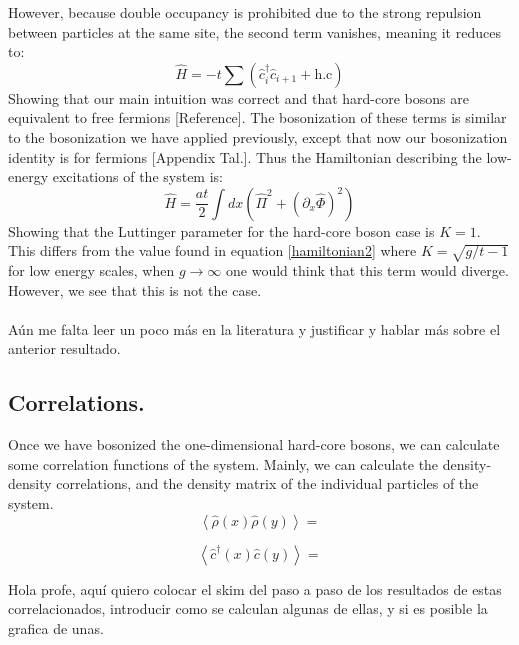 However, because double occupancy is prohibited due to the strong repulsion between particles at the same site, the second term vanishes, meaning it reduces to:
\begin{equation}
    \hat{H} = -t \sum \left( \hat{c}_{i}^{\dagger}\hat{c}_{i+1}^{} + \text{h.c}
 \right) 
\end{equation}
Showing that our main intuition was correct and that hard-core bosons are equivalent to free fermions [Reference]. The bosonization of these terms is similar to the bosonization we have applied previously, except that now our bosonization identity is for fermions [Appendix Tal.]. Thus the Hamiltonian describing the low-energy excitations of the system is:
\begin{equation}
    \hat{H} = \frac{at}{2} \int dx \left( \hat{\Pi}^{2} + \left(\partial_{x} \hat{\Phi}\right)^{2} \right)
\end{equation}
Showing that the Luttinger parameter for the hard-core boson case is $K=1$. This differs from the value found in equation \ref{hamiltonian2} where $K= \sqrt{g/t -1}$ for low energy scales, when $g \rightarrow \infty$ one would think that this term would diverge. However, we see that this is not the case.\\ \\
 \textcolor{myred}{Aún me falta leer un poco más en la literatura y justificar y hablar más sobre el anterior resultado.}


\subsection{Correlations.}
Once we have bosonized the one-dimensional hard-core bosons, we can calculate some correlation functions of the system. Mainly, we can calculate the density-density correlations, and the density matrix of the individual particles of the system.
\begin{equation}
\left\langle\hat{\rho}(x) \hat{\rho}(y)\right\rangle =   
\end{equation}

\begin{equation}
\left\langle\hat{c}^{\dagger}(x) \hat{c}(y)\right\rangle =   
\end{equation}

\textcolor{myred}{Hola profe, aquí quiero colocar el skim del paso a paso de los resultados de estas correlacionados, introducir como se calculan algunas de ellas, y si es posible la grafica de unas.}


